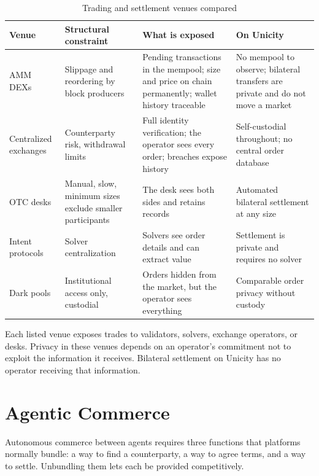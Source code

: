 \begin{table}[h]
    \centering
    \caption{Trading and settlement venues compared}
    \label{tab:defi-comparison}
    \small
    \begin{tabular}{p{2.0cm}p{3.4cm}p{4.4cm}p{4.4cm}}
        \toprule
        \textbf{Venue} & \textbf{Structural constraint} & \textbf{What is exposed} & \textbf{On Unicity} \\
        \midrule
        AMM DEXs & Slippage and reordering by block producers & Pending transactions in the mempool; size and price on chain permanently; wallet history traceable & No mempool to observe; bilateral transfers are private and do not move a market \\
        \addlinespace
        Centralized exchanges & Counterparty risk, withdrawal limits & Full identity verification; the operator sees every order; breaches expose history & Self-custodial throughout; no central order database \\
        \addlinespace
        OTC desks & Manual, slow, minimum sizes exclude smaller participants & The desk sees both sides and retains records & Automated bilateral settlement at any size \\
        \addlinespace
        Intent protocols & Solver centralization & Solvers see order details and can extract value & Settlement is private and requires no solver \\
        \addlinespace
        Dark pools & Institutional access only, custodial & Orders hidden from the market, but the operator sees everything & Comparable order privacy without custody \\
        \bottomrule
    \end{tabular}
\end{table}

Each listed venue exposes trades to validators, solvers, exchange operators, or desks. Privacy in these venues depends on an operator's commitment not to exploit the information it receives. Bilateral settlement on Unicity has no operator receiving that information.

\section{Agentic Commerce}

Autonomous commerce between agents requires three functions that platforms normally bundle: a way to find a counterparty, a way to agree terms, and a way to settle. Unbundling them lets each be provided competitively.

